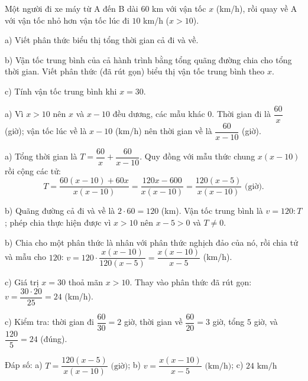 \begin{problem}[8DS-PS-049]
Một người đi xe máy từ A đến B dài $60$ km với vận tốc $x$ (km/h), rồi quay về A với vận tốc nhỏ hơn vận tốc lúc đi $10$ km/h ($x > 10$).

a) Viết phân thức biểu thị tổng thời gian cả đi và về.

b) Vận tốc trung bình của cả hành trình bằng tổng quãng đường chia cho tổng thời gian. Viết phân thức (đã rút gọn) biểu thị vận tốc trung bình theo $x$.

c) Tính vận tốc trung bình khi $x = 30$.

\begin{solution}
a) Vì $x > 10$ nên $x$ và $x - 10$ đều dương, các mẫu khác $0$. Thời gian đi là $\dfrac{60}{x}$ (giờ); vận tốc lúc về là $x - 10$ (km/h) nên thời gian về là $\dfrac{60}{x - 10}$ (giờ).

a) Tổng thời gian là $T = \dfrac{60}{x} + \dfrac{60}{x - 10}$. Quy đồng với mẫu thức chung $x(x - 10)$ rồi cộng các tử:
\[ T = \dfrac{60(x - 10) + 60x}{x(x - 10)} = \dfrac{120x - 600}{x(x - 10)} = \dfrac{120(x - 5)}{x(x - 10)} \text{ (giờ)}. \]

b) Quãng đường cả đi và về là $2 \cdot 60 = 120$ (km). Vận tốc trung bình là $v = 120 : T$; phép chia thực hiện được vì $x > 10$ nên $x - 5 > 0$ và $T \neq 0$.

b) Chia cho một phân thức là nhân với phân thức nghịch đảo của nó, rồi chia tử và mẫu cho $120$: $v = 120 \cdot \dfrac{x(x - 10)}{120(x - 5)} = \dfrac{x(x - 10)}{x - 5}$ (km/h).

c) Giá trị $x = 30$ thoả mãn $x > 10$. Thay vào phân thức đã rút gọn: $v = \dfrac{30 \cdot 20}{25} = 24$ (km/h).

c) Kiểm tra: thời gian đi $\dfrac{60}{30} = 2$ giờ, thời gian về $\dfrac{60}{20} = 3$ giờ, tổng $5$ giờ, và $\dfrac{120}{5} = 24$ (đúng).

Đáp số: a) $\boxed{T = \dfrac{120(x - 5)}{x(x - 10)} \text{ (giờ)}}$; b) $\boxed{v = \dfrac{x(x - 10)}{x - 5} \text{ (km/h)}}$; c) $\boxed{24 \text{ km/h}}$
\end{solution}
\end{problem}

